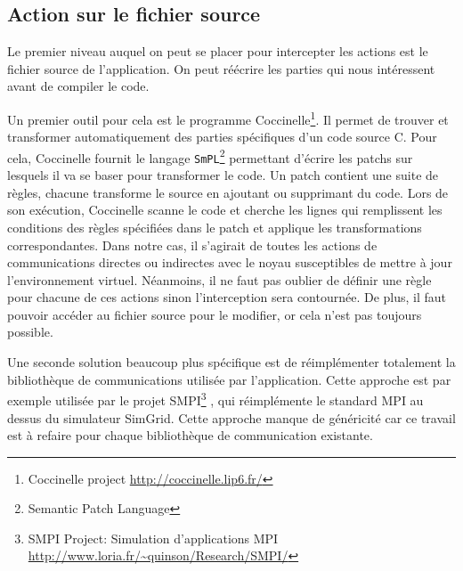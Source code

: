 \subsection{Action sur le fichier source}
\label{subsection:source}
Le premier niveau auquel on peut se placer pour intercepter les actions est le fichier source de l'application. On peut réécrire les parties qui nous intéressent avant de compiler le code.

Un premier outil pour cela est le programme Coccinelle\footnote{Coccinelle project \url{http://coccinelle.lip6.fr/}}. Il permet de trouver et transformer automatiquement des parties spécifiques d'un code source C. Pour cela, Coccinelle fournit le langage \texttt{SmPL}\footnote{Semantic Patch Language} permettant d'écrire les patchs sur lesquels il va se baser pour transformer le code. Un patch contient une suite de règles, chacune transforme le source en ajoutant ou supprimant du code. Lors de son exécution, Coccinelle scanne le code et cherche les lignes qui remplissent les conditions des règles spécifiées dans le patch et applique les transformations correspondantes. Dans notre cas, il s'agirait de toutes les actions de communications directes ou indirectes avec le noyau susceptibles de mettre à jour l'environnement virtuel. Néanmoins, il ne faut pas oublier de définir une règle pour chacune de ces actions sinon l'interception sera contournée. De plus, il faut pouvoir accéder au fichier source pour le modifier, or cela n'est pas toujours possible.

Une seconde solution beaucoup plus spécifique est de réimplémenter totalement la bibliothèque de communications utilisée par l'application. Cette approche est par exemple utilisée par le projet SMPI\footnote{SMPI Project: Simulation d'applications MPI \\ \url{http://www.loria.fr/~quinson/Research/SMPI/}} \citep{clauss2011single}, qui réimplémente le standard MPI au dessus du simulateur SimGrid. Cette approche manque de  généricité car ce travail est à refaire pour chaque bibliothèque de communication existante. 

